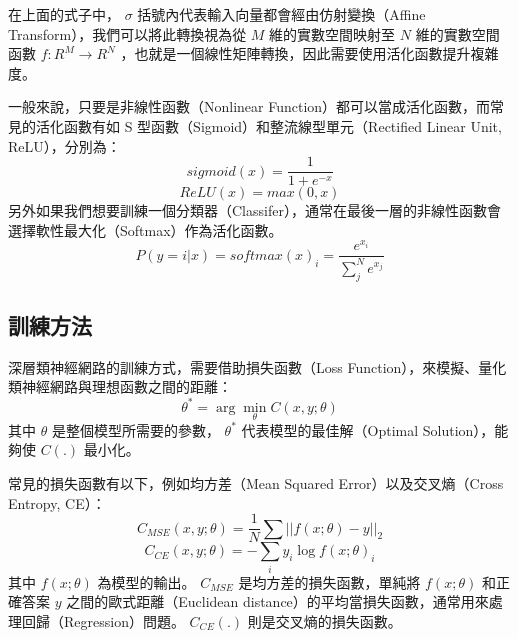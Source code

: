 在上面的式子中， $\sigma$ 括號內代表輸入向量都會經由仿射變換（Affine Transform），我們可以將此轉換視為從 $M$ 維的實數空間映射至 $N$ 維的實數空間函數 $f:R^M \rightarrow R^N$ ，也就是一個線性矩陣轉換，因此需要使用活化函數提升複雜度。

一般來說，只要是非線性函數（Nonlinear Function）都可以當成活化函數，而常見的活化函數有如 S 型函數（Sigmoid）和整流線型單元（Rectified Linear Unit, ReLU），分別為：
\begin{equation}
    sigmoid(x) = \frac{1}{1 + e^{-x}}
\end{equation}
\begin{equation}
    ReLU(x) = max(0,x)
\end{equation}
另外如果我們想要訓練一個分類器（Classifer），通常在最後一層的非線性函數會選擇軟性最大化（Softmax）作為活化函數。
\begin{equation}
    P(y = i|x)= softmax(x)_{i} = \frac{e^{x_i}}{\sum_j^N e^{x_j}}
\end{equation}

\subsection{訓練方法}
深層類神經網路的訓練方式，需要借助損失函數（Loss Function），來模擬、量化類神經網路與理想函數之間的距離：
\begin{equation}
    \theta^{\ast} = \arg\min_{\theta}{C(x,y;\theta)}
\end{equation}
其中 $\theta$ 是整個模型所需要的參數， $\theta^{\ast}$ 代表模型的最佳解（Optimal Solution），能夠使 $C(.)$ 最小化。

常見的損失函數有以下，例如均方差（Mean Squared Error）以及交叉熵（Cross Entropy, CE）：
\begin{equation}
    C_{MSE}(x,y;\theta) = \frac{1}{N}\sum||f(x;\theta) - y||_{2}
\end{equation}
\begin{equation}
    C_{CE}(x,y;\theta) = -\sum_i y_i\log f(x;\theta)_i
\end{equation}
其中 $f(x;\theta)$ 為模型的輸出。 $C_{MSE}$ 是均方差的損失函數，單純將 $f(x;\theta)$ 和正確答案 $y$ 之間的歐式距離（Euclidean distance）的平均當損失函數，通常用來處理回歸（Regression）問題。 $C_{CE}(.)$ 則是交叉熵的損失函數。

